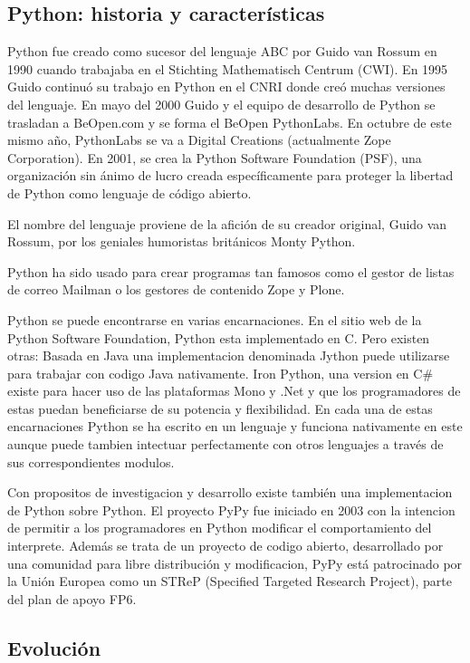 \documentclass[a4paper,spanish,12pt]{book}
\begin{document}
\subsection{Python: historia y características}

Python fue creado como sucesor del lenguaje ABC por Guido van Rossum en 1990 cuando trabajaba en el Stichting Mathematisch Centrum (CWI). En 1995 Guido continuó su trabajo en Python en el CNRI donde creó muchas versiones del lenguaje. En mayo del 2000 Guido y el equipo de desarrollo de Python se trasladan a BeOpen.com y se forma el BeOpen PythonLabs. En octubre de este mismo año, PythonLabs se va a Digital Creations (actualmente Zope Corporation). En 2001, se crea la Python Software Foundation (PSF), una organización sin ánimo de lucro creada específicamente para proteger la libertad de Python como lenguaje de código abierto.

El nombre del lenguaje proviene de la afición de su creador original, Guido van Rossum, por los geniales humoristas británicos Monty Python.

Python ha sido usado para crear programas tan famosos como el gestor de listas de correo Mailman o los gestores de contenido Zope y Plone.

Python se puede encontrarse en varias encarnaciones. En el sitio web de la Python Software Foundation, Python esta implementado en C. Pero existen otras: Basada en Java una implementacion denominada Jython puede utilizarse para trabajar con codigo Java nativamente. Iron Python, una version en C\# existe para hacer uso de las plataformas Mono y .Net y que los programadores de estas puedan beneficiarse de su potencia y flexibilidad. En cada una de estas encarnaciones Python se ha escrito en un lenguaje y funciona nativamente en este aunque puede tambien intectuar perfectamente con otros lenguajes a trav\'es de sus correspondientes modulos.

Con propositos de investigacion y desarrollo existe tambi\'en una implementacion de Python sobre Python. El proyecto PyPy fue iniciado en 2003 con la intencion de permitir a los programadores en Python modificar el comportamiento del interprete. Además se trata de un proyecto de codigo abierto, desarrollado por una comunidad para libre distribución y modificacion, PyPy está patrocinado por la Unión Europea como un STReP (Specified Targeted Research Project), parte del plan de apoyo FP6.

\subsection{Evolución}
\end{document}

